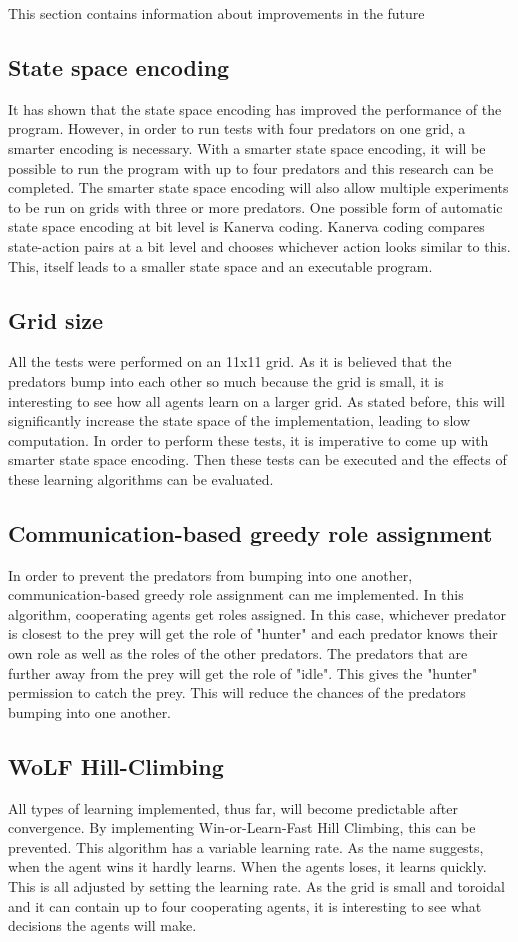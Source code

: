 This section contains information about improvements in the future

\subsection{State space encoding}
It has shown that the state space encoding has improved the performance of the program. However, in order to run tests with four predators on one grid, a smarter encoding is necessary. With a smarter state space encoding, it will be possible to run the program with up to four predators and this research can be completed. The smarter state space encoding will also allow multiple experiments to be run on grids with three or more predators. One possible form of automatic state space encoding at bit level is Kanerva coding\cite{wu2009function}. Kanerva coding compares state-action pairs at a bit level and chooses whichever action looks similar to this. This, itself leads to a smaller state space and an executable program.

\subsection{Grid size}
All the tests were performed on an 11x11 grid. As it is believed that the predators bump into each other so much because the grid is small, it is interesting to see how all agents learn on a larger grid. As stated before, this will significantly increase the state space of the implementation, leading to slow computation. In order to perform these tests, it is imperative to come up with smarter state space encoding. Then these tests can be executed and the effects of these learning algorithms can be evaluated.

\subsection{Communication-based greedy role assignment}
In order to prevent the predators from bumping into one another, communication-based greedy role assignment can me implemented. In this algorithm, cooperating agents get roles assigned. In this case, whichever predator is closest to the prey will get the role of "hunter" and each predator knows their own role as well as the roles of the other predators. The predators that are further away from the prey will get the role of "idle". This gives the "hunter" permission to catch the prey. This will reduce the chances of the predators bumping into one another.

\subsection{WoLF Hill-Climbing}
All types of learning implemented, thus far, will become predictable after convergence. By implementing Win-or-Learn-Fast Hill Climbing, this can be prevented. This algorithm has a variable learning rate. As the name suggests, when the agent wins it hardly learns. When the agents loses, it learns quickly. This is all adjusted by setting the learning rate. As the grid is small and toroidal and it can contain up to four cooperating agents, it is interesting to see what decisions the agents will make.